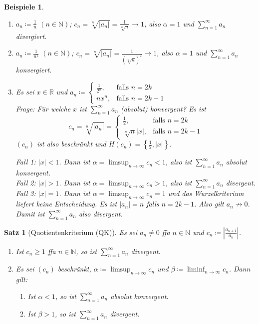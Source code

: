 \documentclass[12pt]{extreport} %
\newcommand{\N}{\mathbb{N}}
\newcommand{\R}{\mathbb{R}}
\theoremstyle{named}
\theoremstyle{itshape}
\newtheorem{satz}[unnamedtheorem]{Satz}
\theoremstyle{normal}
\newtheorem*{beispiele}{Beispiele}
\begin{document}
\begin{beispiele} ~\
	\begin{enumerate}
		\item $a_{n} \coloneqq \frac{1}{n}$ $(n \in \N)$; $c_{n} = \sqrt[n]{|a_{n}|} = \frac{1}{\sqrt[n]{n}} \rightarrow 1$, also $\alpha = 1$ und $\sum_{n=1}^{\infty} a_{n}$ 
		      divergiert.
		\item $a_{n} \coloneqq \frac{1}{n^{2}}$ $(n \in \N)$; $c_{n} = \sqrt[n]{|a_{n}|} = \frac{1}{(\sqrt[n]{n})^{2}} \rightarrow 1$, also $\alpha = 1$ und 
		      $\sum_{n=1}^{\infty} a_{n}$ konvergiert.
		\item Es sei $x \in \R$ und $a_{n} \coloneqq \begin{cases} \frac{1}{2^{n}}, & \text{falls } n = 2k \\ n x^{n}, & \text{falls } n = 2k - 1 \end{cases}$ \\
			Frage: Für welche $x$ ist $\sum_{n=1}^{\infty} a_{n}$ (absolut) konvergent? Es ist
				$$ c_{n} = \sqrt[n]{|a_{n}|} = \begin{cases} \frac{1}{2}, & \text{falls } n = 2k \\ \sqrt[n]{n}|x|, & \text{falls } n = 2k - 1 \end{cases} $$
			$(c_{n})$ ist also beschränkt und $H(c_{n}) = \left\{ \frac{1}{2}, |x| \right\}$.  
			
			Fall 1: $|x| < 1$. Dann ist $\alpha = \limsup_{n \to \infty} c_{n} < 1$, also ist $\sum_{n=1}^{\infty} a_{n}$ absolut konvergent. \\
			Fall 2: $|x| > 1$. Dann ist $\alpha = \limsup_{n \to \infty}  c_{n} > 1$, also ist $\sum_{n=1}^{\infty} a_{n}$ divergent. \\
			Fall 3: $|x| = 1$. Dann ist $\alpha = \limsup_{n \to \infty}  c_{n} = 1$ und das Wurzelkriterium liefert keine Entscheidung. 
			Es ist $|a_{n}| = n$ falls $n = 2k - 1$. Also gilt $a_{n} \not\rightarrow 0$. Damit ist $\sum_{n=1}^{\infty} a_{n}$ also divergent.			
	\end{enumerate}	
\end{beispiele}

\begin{satz}[Quotientenkriterium (QK)] \label{3.7:prop-Quotientenkriterium}
	Es sei $a_{n} \neq 0$ ffa $n \in \N$ und $c_{n} \coloneqq \left| \frac{a_{n+1}}{a_{n}} \right|$.
	\begin{enumerate}
		\item Ist $c_{n} \geq 1$ ffa $n \in \N$, so ist $\sum_{n=1}^{\infty} a_{n}$ divergent.
		\item Es sei $(c_{n})$ beschränkt, $\alpha \coloneqq \limsup_{n \to\infty} c_{n}$ und $\beta \coloneqq \liminf_{n \to\infty} c_{n}$. Dann gilt:
			\begin{enumerate}
				\item Ist $\alpha < 1$, so ist $\sum_{n=1}^{\infty} a_{n}$ absolut konvergent.
				\item Ist $\beta > 1$, so ist $\sum_{n=1}^{\infty} a_{n}$ divergent.
			\end{enumerate}
	\end{enumerate}
\end{satz}
\end{document}
